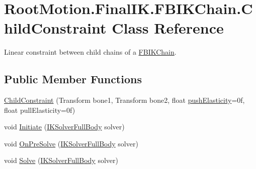 \hypertarget{class_root_motion_1_1_final_i_k_1_1_f_b_i_k_chain_1_1_child_constraint}{}\section{Root\+Motion.\+Final\+I\+K.\+F\+B\+I\+K\+Chain.\+Child\+Constraint Class Reference}
\label{class_root_motion_1_1_final_i_k_1_1_f_b_i_k_chain_1_1_child_constraint}


Linear constraint between child chains of a \mbox{\hyperlink{class_root_motion_1_1_final_i_k_1_1_f_b_i_k_chain}{F\+B\+I\+K\+Chain}}.  


\subsection*{Public Member Functions}
\begin{DoxyCompactItemize}
\item 
\mbox{\hyperlink{class_root_motion_1_1_final_i_k_1_1_f_b_i_k_chain_1_1_child_constraint_ac6e2e5b24842d7850f0a156b10f10dcd}{Child\+Constraint}} (Transform bone1, Transform bone2, float \mbox{\hyperlink{class_root_motion_1_1_final_i_k_1_1_f_b_i_k_chain_1_1_child_constraint_a611b9b5749f46fe9719c20f0dc2bdc91}{push\+Elasticity}}=0f, float pull\+Elasticity=0f)
\item 
void \mbox{\hyperlink{class_root_motion_1_1_final_i_k_1_1_f_b_i_k_chain_1_1_child_constraint_af0bb59f785c4214a0775ef5e6f3afe00}{Initiate}} (\mbox{\hyperlink{class_root_motion_1_1_final_i_k_1_1_i_k_solver_full_body}{I\+K\+Solver\+Full\+Body}} solver)
\item 
void \mbox{\hyperlink{class_root_motion_1_1_final_i_k_1_1_f_b_i_k_chain_1_1_child_constraint_a930d17d18ced06058d764852dc644c8f}{On\+Pre\+Solve}} (\mbox{\hyperlink{class_root_motion_1_1_final_i_k_1_1_i_k_solver_full_body}{I\+K\+Solver\+Full\+Body}} solver)
\item 
void \mbox{\hyperlink{class_root_motion_1_1_final_i_k_1_1_f_b_i_k_chain_1_1_child_constraint_a16775513dc9ce88ccf13343d7efc20bc}{Solve}} (\mbox{\hyperlink{class_root_motion_1_1_final_i_k_1_1_i_k_solver_full_body}{I\+K\+Solver\+Full\+Body}} solver)
\end{DoxyCompactItemize}
